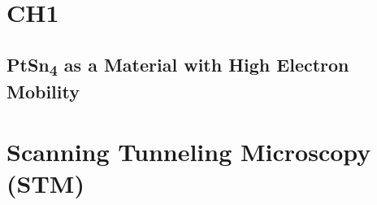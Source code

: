 \chapter{CH1}




\section{PtSn\textsubscript{4} as a Material with High Electron Mobility}

\chapter{Scanning Tunneling Microscopy (STM)}
	













